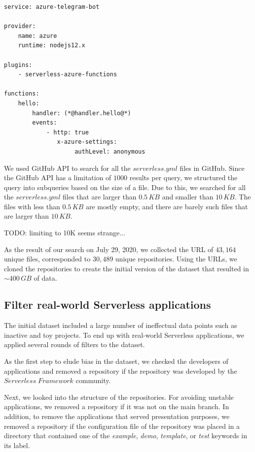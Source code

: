 \begin{lstlisting}[frame=single, caption=An example of a serverless.yml file., label={lst:example}, captionpos=b]
service: azure-telegram-bot 

provider:  
	name: azure
	runtime: nodejs12.x  
	
plugins:  
	- serverless-azure-functions 

functions:
	hello:    
		handler: (*@handler.hello@*)
		events:   
			- http: true        
			   x-azure-settings:          
			   		authLevel: anonymous
\end{lstlisting}

\vspace{2mm}

We used GitHub API to search for all the $serverless.yml$ files in GitHub. 
Since the GitHub API has a limitation of $1000$ results per query, we structured 
the query into subqueries based on the size of a file. 
Due to this, we searched for all the $serverless.yml$ files that are larger 
than $0.5\,KB$ and smaller than $10\,KB$. The files with less than 
$0.5\,KB$ are mostly empty, and there are barely such files that are 
larger than $10\,KB$. 

TODO: limiting to 10K seems strange...

As the result of our search on July 29, 2020, 
we collected the URL of $43,164$ unique files, corresponded to 
$30,489$ unique repositories. Using the URLs, we cloned 
the repositories to create the initial version of the dataset that 
resulted in $\sim 400 \, GB$ of data.

\subsection{Filter real-world Serverless applications} \label{phaseB}
The initial dataset included a large number of ineffectual data points 
such as inactive and toy projects. To end up with real-world Serverless 
applications, we applied several rounds of filters to the dataset.

As the first step to elude bias in the dataset, we checked the developers 
of applications and removed a repository if the repository was developed 
by the $Serverless \; Framework$ community. 

Next, we looked into the structure of the repositories. 
For avoiding unstable applications, we removed a repository if it was not 
on the main branch. In addition, to remove the applications that served 
presentation purposes, we removed a repository if the configuration file 
of the repository was placed in a directory that contained one of the 
\emph{example}, \emph{demo}, \emph{template}, or \emph{test} 
keywords in its label.

